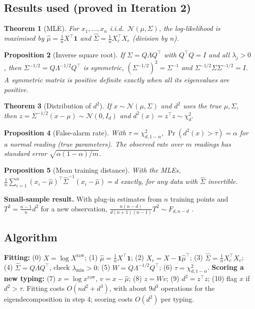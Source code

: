 \documentclass[11pt]{article}
\newtheorem{theorem}{Theorem}[section]
\newtheorem{proposition}[theorem]{Proposition}
\theoremstyle{definition}
\newcommand{\T}{^{\top}}
\begin{document}
\subsection{Results used (proved in Iteration 2)}
\begin{theorem}[MLE]\label{thm:mle}
For $x_1,\dots,x_n$ i.i.d.\ $\mathcal N(\mu,\Sigma)$, the log-likelihood is maximised by $\hat\mu=\frac1nX\T\mathbf 1$ and $\hat\Sigma=\frac1nX_c\T X_c$ (division by $n$).
\end{theorem}
\begin{proposition}[Inverse square root]\label{prop:invsqrt}
If $\Sigma=Q\Lambda Q\T$ with $Q\T Q=I$ and all $\lambda_j>0$, then $\Sigma^{-1/2}=Q\Lambda^{-1/2}Q\T$ is symmetric, $(\Sigma^{-1/2})^2=\Sigma^{-1}$ and $\Sigma^{-1/2}\Sigma\Sigma^{-1/2}=I$. A symmetric matrix is positive definite exactly when all its eigenvalues are positive.
\end{proposition}
\begin{theorem}[Distribution of $d^2$]\label{thm:chi2}
If $x\sim\mathcal N(\mu,\Sigma)$ and $d^2$ uses the true $\mu,\Sigma$, then $z=\Sigma^{-1/2}(x-\mu)\sim\mathcal N(0,I_d)$ and $d^2(x)=z\T z\sim\chi^2_d$.
\end{theorem}
\begin{proposition}[False-alarm rate]\label{prop:far}
With $\tau=\chi^2_{d,1-\alpha}$, $\Pr(d^2(x)>\tau)=\alpha$ for a normal reading (true parameters). The observed rate over $m$ readings has standard error $\sqrt{\alpha(1-\alpha)/m}$.
\end{proposition}
\begin{proposition}[Mean training distance]\label{prop:meand}
With the MLEs, $\frac1n\sum_{i=1}^n(x_i-\hat\mu)\T\hat\Sigma^{-1}(x_i-\hat\mu)=d$ exactly, for any data with $\hat\Sigma$ invertible.
\end{proposition}
\noindent\textbf{Small-sample result.} With plug-in estimates from $n$ training points and $T^2=\frac{n-1}{n}d^2$ for a new observation, $\frac{n(n-d)}{d(n+1)(n-1)}T^2\sim F_{d,n-d}$ \cite{jw}.

\subsection{Algorithm}
\textbf{Fitting:} (0) $X=\log X^{\text{raw}}$; (1) $\hat\mu=\frac1nX\T\mathbf 1$; (2) $X_c=X-\mathbf 1\hat\mu\T$; (3) $\hat\Sigma=\frac1nX_c\T X_c$; (4) $\hat\Sigma=Q\Lambda Q\T$, check $\lambda_{\min}>0$; (5) $W=Q\Lambda^{-1/2}Q\T$; (6) $\tau=\chi^2_{d,1-\alpha}$.
\textbf{Scoring a new typing:} (7) $x=\log x^{\text{raw}}$, $v=x-\hat\mu$; (8) $z=Wv$; (9) $d^2=z\T z$; (10) flag $x$ if $d^2>\tau$.
Fitting costs $O(nd^2+d^3)$, with about $9d^3$ operations for the eigendecomposition in step 4; scoring costs $O(d^2)$ per typing.
\end{document}

